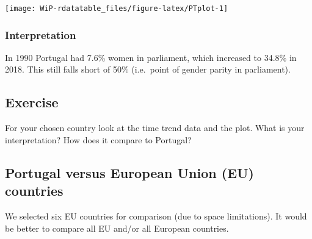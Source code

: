 \documentclass[a4paper,9pt,twocolumn,twoside,printwatermark=false]{pinp}
\begin{document}
\begin{center}\texttt{[image: WiP-rdatatable\_files/figure-latex/PTplot-1]} \end{center}

\subsubsection{Interpretation}\label{interpretation}

In 1990 Portugal had 7.6\% women in parliament, which increased to
34.8\% in 2018. This still falls short of 50\% (i.e.~point of gender
parity in parliament).

\subsection{Exercise}\label{exercise-4}

For your chosen country look at the time trend data and the plot. What
is your interpretation? How does it compare to Portugal?

\subsection{Portugal versus European Union (EU)
countries}\label{portugal-versus-european-union-eu-countries}

We selected six EU countries for comparison (due to space limitations).
It would be better to compare all EU and/or all European countries.

\begin{Shaded}
\end{Shaded}
\end{document}
